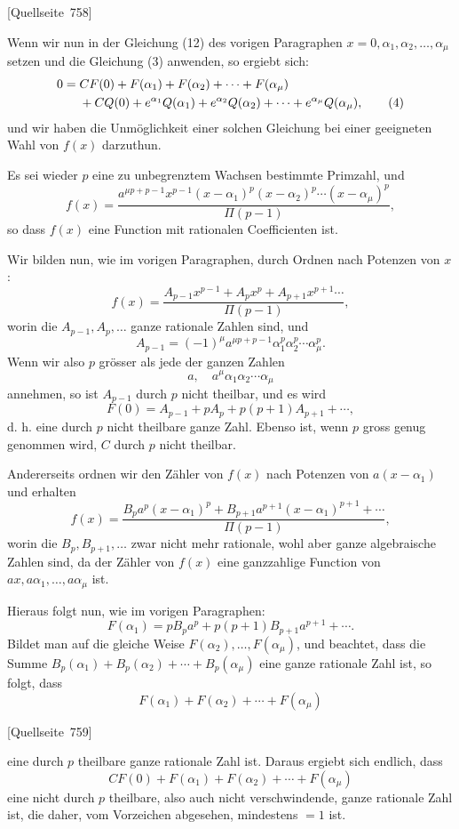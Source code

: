 \documentclass[11pt]{article}
\newcommand{\srcpage}[1]{\par\medskip\noindent\textsf{[Quellseite~#1]}\par\smallskip}
\begin{document}
\srcpage{758}
Wenn wir nun in der Gleichung (12) des vorigen Paragraphen $x=0,\alpha_1,\alpha_2,\ldots,\alpha_\mu$ setzen und die Gleichung (3) anwenden, so ergiebt sich:
\begin{align}
0={}&CF(0)+F(\alpha_1)+F(\alpha_2)+\cdots+F(\alpha_\mu)\notag\\
&+CQ(0)+e^{\alpha_1}Q(\alpha_1)+e^{\alpha_2}Q(\alpha_2)+\cdots+e^{\alpha_\mu}Q(\alpha_\mu),
\tag{4}
\end{align}
und wir haben die Unmöglichkeit einer solchen Gleichung bei einer geeigneten Wahl von $f(x)$ darzuthun.

Es sei wieder $p$ eine zu unbegrenztem Wachsen bestimmte Primzahl, und
\begin{equation}\tag{5}
f(x)=
\frac{a^{\mu p+p-1}x^{p-1}(x-\alpha_1)^p(x-\alpha_2)^p\cdots(x-\alpha_\mu)^p}{\Pi(p-1)},
\end{equation}
so dass $f(x)$ eine Function mit rationalen Coefficienten ist.

Wir bilden nun, wie im vorigen Paragraphen, durch Ordnen nach Potenzen von $x$:
\[
f(x)=\frac{A_{p-1}x^{p-1}+A_px^p+A_{p+1}x^{p+1}\cdots}{\Pi(p-1)},
\]
worin die $A_{p-1},A_p,\ldots$ ganze rationale Zahlen sind, und
\[
A_{p-1}=(-1)^\mu a^{\mu p+p-1}\alpha_1^p\alpha_2^p\cdots\alpha_\mu^p.
\]
Wenn wir also $p$ grösser als jede der ganzen Zahlen
\[
a,\quad a^\mu\alpha_1\alpha_2\cdots\alpha_\mu
\]
annehmen, so ist $A_{p-1}$ durch $p$ nicht theilbar, und es wird
\[
F(0)=A_{p-1}+pA_p+p(p+1)A_{p+1}+\cdots,
\]
d. h. eine durch $p$ nicht theilbare ganze Zahl. Ebenso ist, wenn $p$ gross genug genommen wird, $C$ durch $p$ nicht theilbar.

Andererseits ordnen wir den Zähler von $f(x)$ nach Potenzen von $a(x-\alpha_1)$ und erhalten
\[
f(x)=\frac{B_pa^p(x-\alpha_1)^p+B_{p+1}a^{p+1}(x-\alpha_1)^{p+1}+\cdots}{\Pi(p-1)},
\]
worin die $B_p,B_{p+1},\ldots$ zwar nicht mehr rationale, wohl aber ganze algebraische Zahlen sind, da der Zähler von $f(x)$ eine ganzzahlige Function von $ax,a\alpha_1,\ldots,a\alpha_\mu$ ist.

Hieraus folgt nun, wie im vorigen Paragraphen:
\[
F(\alpha_1)=pB_pa^p+p(p+1)B_{p+1}a^{p+1}+\cdots.
\]
Bildet man auf die gleiche Weise $F(\alpha_2),\ldots,F(\alpha_\mu)$, und beachtet, dass die Summe $B_p(\alpha_1)+B_p(\alpha_2)+\cdots+B_p(\alpha_\mu)$ eine ganze rationale Zahl ist, so folgt, dass
\[
F(\alpha_1)+F(\alpha_2)+\cdots+F(\alpha_\mu)
\]
\srcpage{759}
eine durch $p$ theilbare ganze rationale Zahl ist. Daraus ergiebt sich endlich, dass
\[
CF(0)+F(\alpha_1)+F(\alpha_2)+\cdots+F(\alpha_\mu)
\]
eine nicht durch $p$ theilbare, also auch nicht verschwindende, ganze rationale Zahl ist, die daher, vom Vorzeichen abgesehen, mindestens $=1$ ist.
\end{document}
